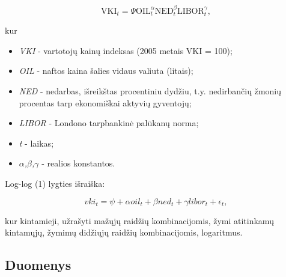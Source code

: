 \documentclass[a4paper]{article}
\begin{document}
\begin{equation}
\text{VKI}_t = \Psi \text{OIL}^\alpha_t \text{NED}^\beta_t \text{LIBOR}^\gamma_t,
\end{equation}

\noindent kur

\begin{itemize}
\item \textit{VKI} - vartotojų kainų indeksas (2005 metais VKI = 100);
\item \textit{OIL} - naftos kaina šalies vidaus valiuta (litais);
\item \textit{NED} - nedarbas, išreikštas procentiniu dydžiu, t.y. nedirbančių žmonių procentas tarp ekonomiškai aktyvių gyventojų;
\item \textit{LIBOR} - Londono tarpbankinė palūkanų norma;
\item{\textit{t} - laikas;}
\item \textit{$\alpha$,$\beta$,$\gamma$} - realios konstantos.
\end{itemize}
 


\noindent Log-log (1) lygties išraiška:

\begin{equation}
\textit{vki}_t = \psi + \alpha \textit{oil}_t + \beta \textit{ned}_t + \gamma \textit{libor}_t+\epsilon_t,
\end{equation}

\noindent kur  kintamieji, užrašyti mažųjų raidžių kombinacijomis, žymi atitinkamų kintamųjų, žymimų didžiųjų raidžių kombinacijomis, logaritmus.

\newpage	
	\subsection{Duomenys} \indent
	
\end{document}
